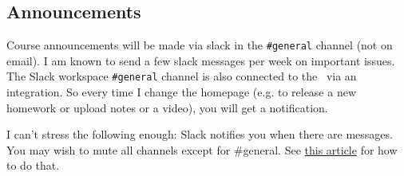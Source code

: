 
\subsection*{Announcements}

Course announcements will be made via slack in the \texttt{\#general} channel (not on email). I am known to send a few slack messages per week on important issues. The Slack workspace \texttt{\#general} channel is also connected to the \coursewebpagelink~via an integration. So every time I change the homepage (e.g. to release a new homework or upload notes or a video), you will get a notification.

I can't stress the following enough:  Slack notifies you when there are messages. You may wish to mute all channels except for \#general. See \href{https://slack.com/help/articles/204411433-Mute-channels-and-direct-messages}{this article} for how to do that.